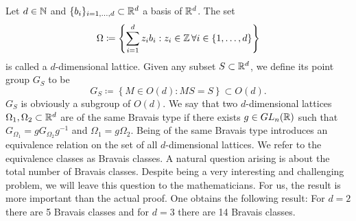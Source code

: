 Let $d\in\mathbb{N}$ and $\{b_i\}_{i=1,\dots,d}\subset \mathbb{R}^d$ a basis of $\mathbb{R}^d$. The set 
\begin{equation*}
    \Omega\coloneq\left\{\sum_{i=1}^{d}z_i b_i: z_i\in\mathbb{Z}\,\forall i\in\{1,\dots,d\}\right\}
\end{equation*}
is called a $d$-dimensional lattice. Given any subset $S\subset\mathbb{R}^d$, we define its point group $G_S$ to be
\begin{equation*}
    G_S\coloneq \left\{M\in O(d) : MS=S\right\}\subset O(d).
\end{equation*}
$G_S$ is obviously a subgroup of $O(d)$. We say that two $d$-dimensional lattices $\Omega_1, \Omega_2\subset \mathbb{R}^d$ are of the same Bravais type if
there exists $g\in GL_n(\mathbb{R})$ such that $G_{\Omega_1}=g G_{\Omega_2} g^{-1}$ and $\Omega_1=g\Omega_2$. 
Being of the same Bravais type introduces an equivalence relation on the set of all $d$-dimensional lattices. We refer to the equivalence classes as Bravais classes.
A natural question arising is about the total number of Bravais classes. Despite being a very interesting and challenging problem,
we will leave this question to the mathematicians. For us, the result is more important than the actual proof. One obtains the following result:
For $d=2$ there are 5 Bravais classes and for $d=3$ there are 14 Bravais classes. 
